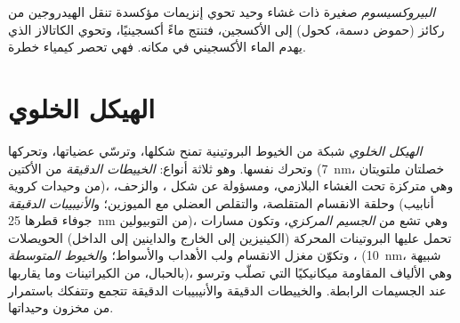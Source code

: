\begin{definition}[البيروكسيسوم]\label{def:b1:eukaryotic-cell:peroxisome}
\emph{البيروكسيسوم}  صغيرة ذات غشاء وحيد تحوي
إنزيمات مؤكسدة تنقل الهيدروجين من ركائز (حموض دسمة، كحول) إلى
الأكسجين، فتنتج ماءً أكسجينيًا، وتحوي الكاتالاز الذي يهدم الماء
الأكسجيني في مكانه. فهي تحصر كيمياء خطرة.
\end{definition}

\section{الهيكل الخلوي}

\begin{definition}\label{def:b1:eukaryotic-cell:cytoskeleton}
\emph{الهيكل الخلوي} شبكة من الخيوط البروتينية تمنح
 شكلها، وترسّي عضياتها، وتحركها وتحرك  نفسها. وهو ثلاثة
أنواع: \emph{الخييطات الدقيقة} من الأكتين
(\qty{7}{nm}، خصلتان ملتويتان من وحيدات كروية)، وهي متركزة تحت
الغشاء البلازمي، ومسؤولة عن شكل ، والزحف، وحلقة الانقسام
المتقلصة، والتقلص العضلي مع الميوزين؛
و\emph{الأنيبيبات الدقيقة} (أنابيب جوفاء قطرها
\qty{25}{nm} من التوبيولين)، وهي تشع من \emph{الجسيم
المركزي}، وتكون مسارات تحمل عليها البروتينات
المحركة (الكينيزين إلى الخارج والداينين إلى الداخل) الحويصلات
، وتكوّن مغزل الانقسام ولب الأهداب والأسواط؛
و\emph{الخيوط المتوسطة} (\qty{10}{nm}، شبيهة
بالحبال، من الكيراتينات وما يقاربها)، وهي الألياف المقاومة ميكانيكيًا
التي تصلّب  وترسو عند الجسيمات الرابطة. والخييطات الدقيقة
والأنيبيبات الدقيقة تتجمع وتتفكك باستمرار من مخزون وحيداتها.
\end{definition}

